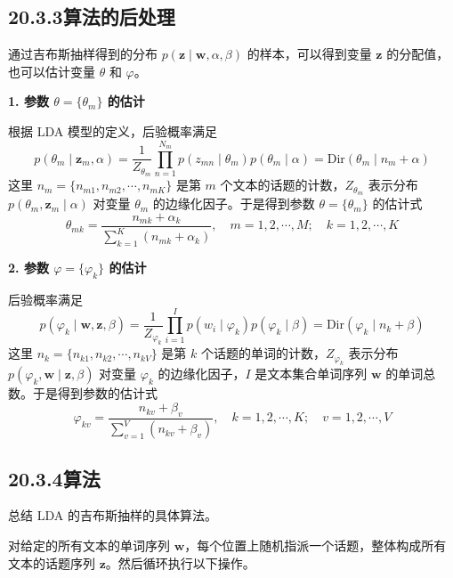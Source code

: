 \documentclass[UTF8,12pt,a4paper,fontset=fandol]{ctexart}
\begin{document}
\subsection*{20.3.3\quad 算法的后处理}

通过吉布斯抽样得到的分布 $p(\mathbf{z}\mid\mathbf{w},\alpha,\beta)$ 的样本，可以得到变量 $\mathbf{z}$ 的分配值，也可以估计变量 $\theta$ 和 $\varphi$。

\noindent\textbf{1. 参数 $\theta=\{\theta_m\}$ 的估计}

根据 LDA 模型的定义，后验概率满足
\begin{equation}
p(\theta_m\mid\mathbf{z}_m,\alpha)=\frac{1}{Z_{\theta_m}}\prod_{n=1}^{N_m}p(z_{mn}\mid\theta_m)p(\theta_m\mid\alpha)=\mathrm{Dir}(\theta_m\mid n_m+\alpha)
\tag{20.30}
\end{equation}
这里 $n_m=\{n_{m1},n_{m2},\cdots,n_{mK}\}$ 是第 $m$ 个文本的话题的计数，$Z_{\theta_m}$ 表示分布 $p(\theta_m,\mathbf{z}_m\mid\alpha)$ 对变量 $\theta_m$ 的边缘化因子。于是得到参数 $\theta=\{\theta_m\}$ 的估计式
\begin{equation}
\theta_{mk}=\frac{n_{mk}+\alpha_k}{\sum_{k=1}^K(n_{mk}+\alpha_k)},\quad m=1,2,\cdots,M;\quad k=1,2,\cdots,K
\tag{20.31}
\end{equation}

\noindent\textbf{2. 参数 $\varphi=\{\varphi_k\}$ 的估计}

后验概率满足
\begin{equation}
p(\varphi_k\mid\mathbf{w},\mathbf{z},\beta)=\frac{1}{Z_{\varphi_k}}\prod_{i=1}^I p(w_i\mid\varphi_k)p(\varphi_k\mid\beta)=\mathrm{Dir}(\varphi_k\mid n_k+\beta)
\tag{20.32}
\end{equation}
这里 $n_k=\{n_{k1},n_{k2},\cdots,n_{kV}\}$ 是第 $k$ 个话题的单词的计数，$Z_{\varphi_k}$ 表示分布 $p(\varphi_k,\mathbf{w}\mid\mathbf{z},\beta)$ 对变量 $\varphi_k$ 的边缘化因子，$I$ 是文本集合单词序列 $\mathbf{w}$ 的单词总数。于是得到参数的估计式
\begin{equation}
\varphi_{kv}=\frac{n_{kv}+\beta_v}{\sum_{v=1}^V(n_{kv}+\beta_v)},\quad k=1,2,\cdots,K;\quad v=1,2,\cdots,V
\tag{20.33}
\end{equation}

\subsection*{20.3.4\quad 算法}

总结 LDA 的吉布斯抽样的具体算法。

对给定的所有文本的单词序列 $\mathbf{w}$，每个位置上随机指派一个话题，整体构成所有文本的话题序列 $\mathbf{z}$。然后循环执行以下操作。
\end{document}
